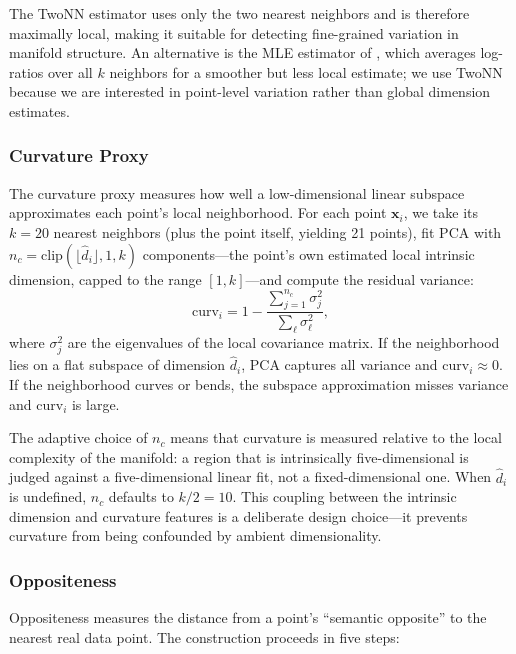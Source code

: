 The TwoNN estimator uses only the two nearest neighbors and is therefore maximally local, making it suitable for detecting fine-grained variation in manifold structure. An alternative is the MLE estimator of \citet{levina2004maximum}, which averages log-ratios over all $k$ neighbors for a smoother but less local estimate; we use TwoNN because we are interested in point-level variation rather than global dimension estimates.

\subsubsection{Curvature Proxy}
\label{sec:curvature}

The curvature proxy measures how well a low-dimensional linear subspace approximates each point's local neighborhood. For each point $\mathbf{x}_i$, we take its $k = 20$ nearest neighbors (plus the point itself, yielding 21 points), fit PCA with $n_c = \text{clip}(\lfloor \hat{d}_i \rfloor, 1, k)$ components---the point's own estimated local intrinsic dimension, capped to the range $[1, k]$---and compute the residual variance:
\begin{equation}
\text{curv}_i = 1 - \frac{\sum_{j=1}^{n_c} \sigma_j^2}{\sum_{\ell} \sigma_\ell^2},
\label{eq:curvature}
\end{equation}
where $\sigma_j^2$ are the eigenvalues of the local covariance matrix. If the neighborhood lies on a flat subspace of dimension $\hat{d}_i$, PCA captures all variance and $\text{curv}_i \approx 0$. If the neighborhood curves or bends, the subspace approximation misses variance and $\text{curv}_i$ is large.

The adaptive choice of $n_c$ means that curvature is measured relative to the local complexity of the manifold: a region that is intrinsically five-dimensional is judged against a five-dimensional linear fit, not a fixed-dimensional one. When $\hat{d}_i$ is undefined, $n_c$ defaults to $k / 2 = 10$. This coupling between the intrinsic dimension and curvature features is a deliberate design choice---it prevents curvature from being confounded by ambient dimensionality.

\subsubsection{Oppositeness}
\label{sec:oppositeness}

Oppositeness measures the distance from a point's ``semantic opposite'' to the nearest real data point. The construction proceeds in five steps:

